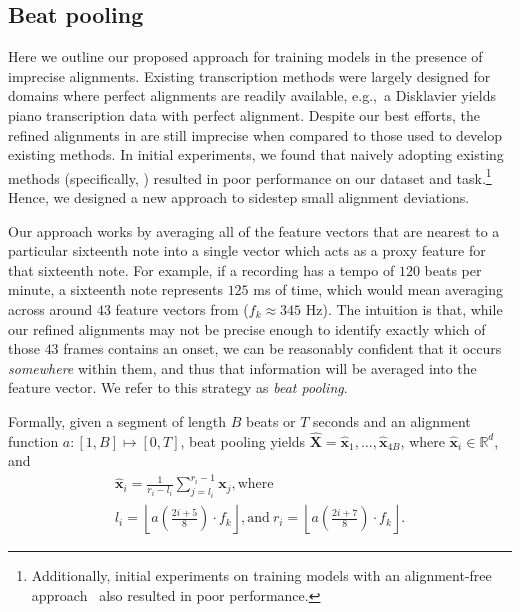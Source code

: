 \subsection{Beat pooling}
\label{sec:beatpool}


Here we outline our proposed approach for training models in the presence of imprecise alignments. 
Existing transcription methods were largely designed for domains where perfect alignments are readily available, e.g.,~a Disklavier yields piano transcription data with perfect alignment. 
Despite our best efforts, the refined alignments in \hooktheory{} are still imprecise when compared to those used to develop existing methods. 
In initial experiments, we found that naively adopting existing methods (specifically, \cite{hawthorne2017onsets,hawthorne2021sequence}) resulted in poor performance on our dataset and task.\footnote{Additionally, initial experiments on training models with an alignment-free approach~\cite{graves2006connectionist} also resulted in poor performance.} 
Hence, we designed a new approach to sidestep small alignment deviations.

Our approach works by averaging all of the feature vectors that are nearest to a particular sixteenth note into a single vector which acts as a proxy feature for that sixteenth note. 
For example, if a recording has a tempo of $120$ beats per minute, a sixteenth note represents $125$ ms of time, which would mean averaging across around $43$ feature vectors from \jukebox{} ($f_k \approx 345$ Hz). 
The intuition is that, while our refined alignments may not be precise enough to identify exactly which of those $43$ frames contains an onset, we can be reasonably confident that it occurs \emph{somewhere} within them, and thus that information will be averaged into the feature vector.
We refer to this strategy as \emph{beat pooling}.

Formally, given a segment of length $B$ beats or $T$ seconds and an alignment function ${a: [1, B] \mapsto [0, T]}$, beat pooling yields ${\hat{\bm{X}} = \hat{\bm{x}}_1, \ldots, \hat{\bm{x}}_{4B}}$, where ${\hat{\bm{x}}_i \in \mathbb{R}^d}$, and
\begin{gather*}
\bm{\hat{x}}_i = \frac{1}{r_i - l_i} \sum_{j = l_i}^{r_i - 1} \bm{x}_j, \text{where} \\
l_i = \left\lfloor a \left(\frac{2i + 5}{8} \right) \cdot f_k \right\rfloor, \text{and}~
r_i = \left\lfloor a \left(\frac{2i + 7}{8} \right) \cdot f_k \right\rfloor.
\end{gather*}

